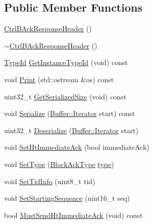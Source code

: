 \subsection*{Public Member Functions}
\begin{DoxyCompactItemize}
\item 
\hyperlink{classns3_1_1CtrlBAckResponseHeader_aea5f47443b7200809f1282f322a7c12b}{Ctrl\+B\+Ack\+Response\+Header} ()
\item 
\hyperlink{classns3_1_1CtrlBAckResponseHeader_a131e3722e27f1ac9cbad06d696eefad0}{$\sim$\+Ctrl\+B\+Ack\+Response\+Header} ()
\item 
\hyperlink{classns3_1_1TypeId}{Type\+Id} \hyperlink{classns3_1_1CtrlBAckResponseHeader_a0fee09862cb3980120b0f6bbbac4e660}{Get\+Instance\+Type\+Id} (void) const 
\item 
void \hyperlink{classns3_1_1CtrlBAckResponseHeader_acef72a78a659a753113a5ca47b10582c}{Print} (std\+::ostream \&os) const 
\item 
uint32\+\_\+t \hyperlink{classns3_1_1CtrlBAckResponseHeader_a6bb606519f2523a48faaec6d11be92fc}{Get\+Serialized\+Size} (void) const 
\item 
void \hyperlink{classns3_1_1CtrlBAckResponseHeader_a6897cce5cb77fcaf74f6384cf6d9350c}{Serialize} (\hyperlink{classns3_1_1Buffer_1_1Iterator}{Buffer\+::\+Iterator} start) const 
\item 
uint32\+\_\+t \hyperlink{classns3_1_1CtrlBAckResponseHeader_ab970e4b1ec29e06bcfb79886506a0f9a}{Deserialize} (\hyperlink{classns3_1_1Buffer_1_1Iterator}{Buffer\+::\+Iterator} start)
\item 
void \hyperlink{classns3_1_1CtrlBAckResponseHeader_ad9ea3fa3653974a759d58a82cb8b61fc}{Set\+Ht\+Immediate\+Ack} (bool immediate\+Ack)
\item 
void \hyperlink{classns3_1_1CtrlBAckResponseHeader_aa726aabb711b481d35703f1bf5fe59d9}{Set\+Type} (\hyperlink{namespacens3_a90f436472d19d7d7f37cbf0b8c288ff7}{Block\+Ack\+Type} \hyperlink{visualizer-ideas_8txt_add98db9e15e2a58cf2b57623e7aa893a}{type})
\item 
void \hyperlink{classns3_1_1CtrlBAckResponseHeader_a4dae02f2802abe5a0b1546fa7ca99065}{Set\+Tid\+Info} (uint8\+\_\+t tid)
\item 
void \hyperlink{classns3_1_1CtrlBAckResponseHeader_a7dade9f09cdfab9f438e8dd7ca72cbb0}{Set\+Starting\+Sequence} (uint16\+\_\+t seq)
\item 
bool \hyperlink{classns3_1_1CtrlBAckResponseHeader_ab909baa0f203fe882bdccb50e903564b}{Must\+Send\+Ht\+Immediate\+Ack} (void) const 

\end{DoxyCompactItemize}
